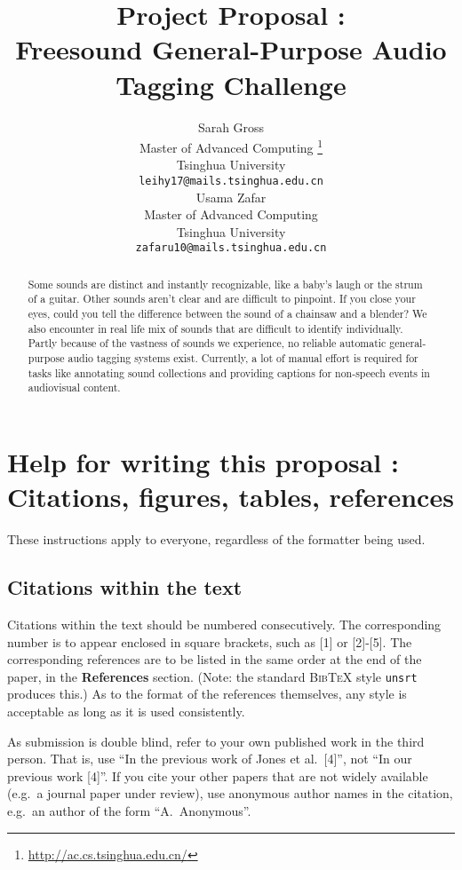 \documentclass{article} %
\title{Project Proposal : \\Freesound General-Purpose Audio Tagging Challenge}
\author{
Sarah Gross \\
Master of Advanced Computing \thanks{\url{http://ac.cs.tsinghua.edu.cn/}}\\
Tsinghua University\\
\texttt{leihy17@mails.tsinghua.edu.cn} \\
\And
Usama Zafar\\
Master of Advanced Computing\\
Tsinghua University\\
\texttt{zafaru10@mails.tsinghua.edu.cn} \\
}
\begin{document}
\maketitle

\begin{abstract}
Some sounds are distinct and instantly recognizable, like a baby's laugh or the strum of a guitar. Other sounds aren’t clear and are difficult to pinpoint. 
If you close your eyes, could you tell the difference between the sound of a chainsaw and a blender? We also encounter in real life mix of sounds that are difficult to identify individually.
Partly because of the vastness of sounds we experience, no reliable automatic general-purpose audio tagging systems exist. Currently, a lot of manual effort is required for tasks like annotating sound collections and providing captions for non-speech events in audiovisual content.

\end{abstract}

\section{Help for writing this proposal : Citations, figures, tables, references}
	\label{others}

	These instructions apply to everyone, regardless of the formatter being used.

	\subsection{Citations within the text}

	Citations within the text should be numbered consecutively. The corresponding
	number is to appear enclosed in square brackets, such as [1] or [2]-[5]. The
	corresponding references are to be listed in the same order at the end of the
	paper, in the \textbf{References} section. (Note: the standard
	\textsc{Bib\TeX} style \texttt{unsrt} produces this.) As to the format of the
	references themselves, any style is acceptable as long as it is used
	consistently.

	As submission is double blind, refer to your own published work in the 
	third person. That is, use ``In the previous work of Jones et al.\ [4]'',
	not ``In our previous work [4]''. If you cite your other papers that
	are not widely available (e.g.\ a journal paper under review), use
	anonymous author names in the citation, e.g.\ an author of the
	form ``A.\ Anonymous''. 
\end{document}
